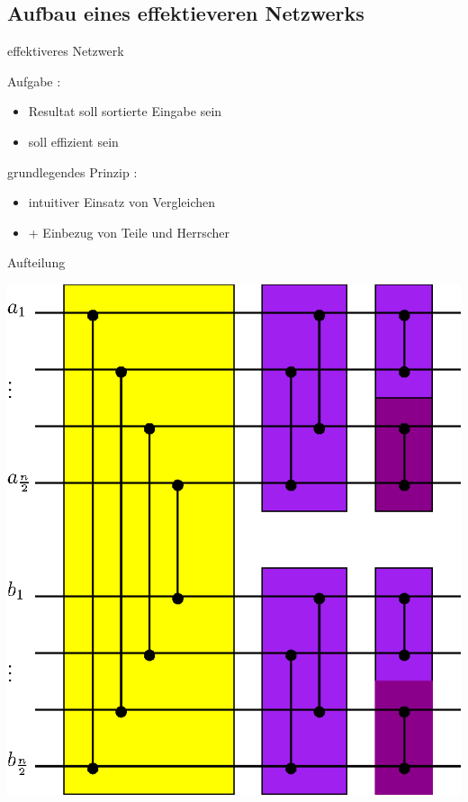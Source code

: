 \documentclass[ucs,9pt]{beamer}
\begin{document}
\subsection*{Aufbau eines effektieveren Netzwerks}
\begin{frame}{effektiveres Netzwerk}
    \begin{semiverbatim}
    		 { }
         {Aufgabe :
            \begin{itemize}
                \item Resultat soll sortierte Eingabe sein
                \item \alert{soll effizient sein}
            \end{itemize}}
         {grundlegendes Prinzip :
            \begin{itemize}
                \item intuitiver Einsatz von Vergleichen
                \item[]\alert{+ Einbezug von Teile und Herrscher}
            \end{itemize}}
    \end{semiverbatim}
\end{frame}

\begin{frame}{Aufteilung}
\begin{center}
\includegraphics[scale=0.6]{bitonmischer.eps}
\end{center}
\end{frame}
\end{document}
